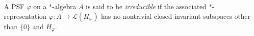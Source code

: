 A PSF $\varphi$ on a $*$-algebra $A$ is said to be \textit{irreducible} if the associated $*$-representation $\varphi: A \to \mathcal{L}(H_\varphi)$ has no nontrivial closed invariant subspaces other than $\{0\}$ and $H_\varphi$.
